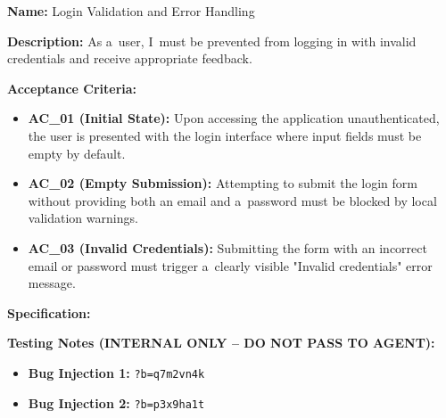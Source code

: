 \documentclass[czech, ing, kiv, he, iso690numb, viewonly]{fasthesis}
\begin{document}
\begin{tcolorbox}[breakable, colback=gray!4, colframe=black!35, boxrule=0.4pt, arc=2pt, boxsep=1pt, left=3pt, right=3pt, top=2pt, bottom=2pt, before skip=6pt, after skip=6pt, fontupper=\small, title={US-02 -- Login Validation and Error Handling}]
\textbf{Name:} Login Validation and Error Handling

\textbf{Description:} As a~user, I~must be prevented from logging in with invalid credentials and receive appropriate feedback.

\textbf{Acceptance Criteria:}
\begin{itemize}
    \item \textbf{AC\_01 (Initial State):} Upon accessing the application unauthenticated, the user is presented with the login interface where input fields must be empty by default.
    \item \textbf{AC\_02 (Empty Submission):} Attempting to submit the login form without providing both an email and a~password must be blocked by local validation warnings.
    \item \textbf{AC\_03 (Invalid Credentials):} Submitting the form with an incorrect email or password must trigger a~clearly visible "Invalid credentials" error message.
\end{itemize}

\textbf{Specification:}     

\textbf{\textcolor{BrickRed}{Testing Notes (INTERNAL ONLY -- DO NOT PASS TO AGENT):}}
\begin{itemize}
    \item \textbf{Bug Injection 1:} \texttt{?b=q7m2vn4k}
    \item \textbf{Bug Injection 2:} \texttt{?b=p3x9ha1t}
\end{itemize}
\end{tcolorbox}
\end{document}

